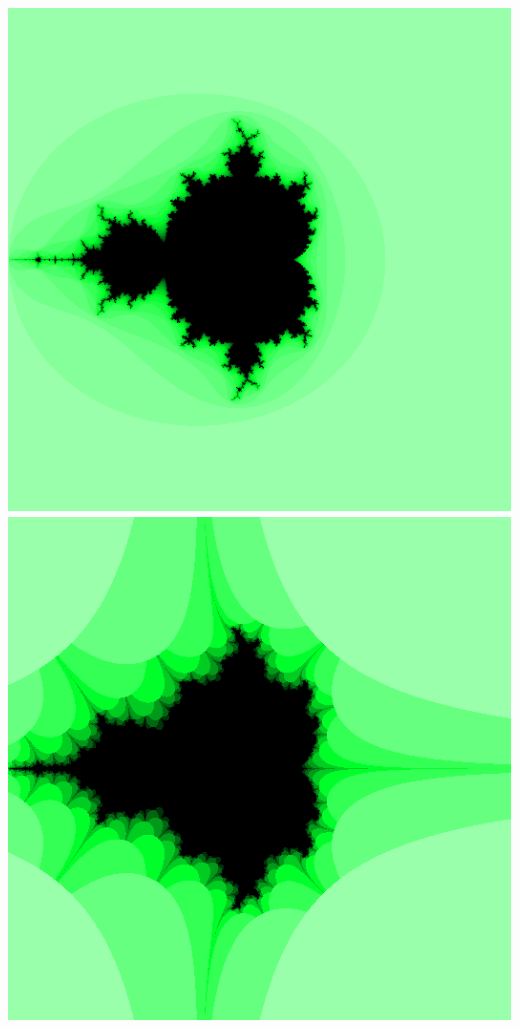 \documentclass[../r.tex]{subfiles}
\begin{document}
\includegraphics[scale=0.15]{../TAing/mandel/green_sqrt.png}
\includegraphics[scale=0.15]{../TAing/mandel/green_y.png}
\end{document}
